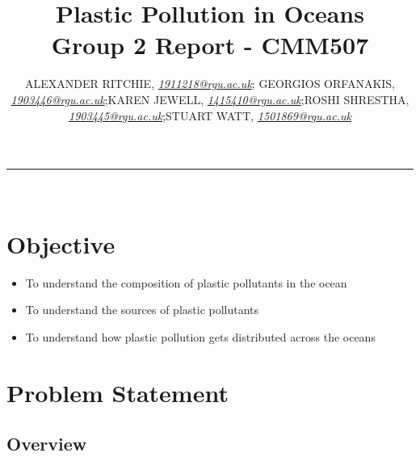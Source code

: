 \documentclass[10pt]{article}\usepackage[]{graphicx}\usepackage[]{color}
\begin{document}


\title{\LARGE Plastic Pollution in Oceans  \\ Group 2 Report - CMM507}

\author{ALEXANDER RITCHIE, \textit{\href{1911218@rgu.ac.uk}{1911218@rgu.ac.uk}}; GEORGIOS ORFANAKIS, \textit{\href{1903446@rgu.ac.uk}{1903446@rgu.ac.uk}};KAREN JEWELL, \textit{\href{1415410@rgu.ac.uk}{1415410@rgu.ac.uk}};ROSHI SHRESTHA, \textit{\href{1903445@rgu.ac.uk}{1903445@rgu.ac.uk}};STUART WATT, \textit{\href{1501869@rgu.ac.uk}{1501869@rgu.ac.uk}}}

\maketitle
\noindent\rule{16cm}{0.4pt}
\ \\

\section*{Objective}


\begin{itemize}
\item To understand the composition of plastic pollutants in the ocean
\item To understand the sources of plastic pollutants
\item To understand how plastic pollution gets distributed across the oceans
\end{itemize}

\section{Problem Statement}\label{statement}


\subsection{Overview}\label{over}

\end{document}
